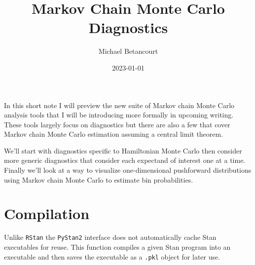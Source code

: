 \documentclass[
  letterpaper,
  DIV=11,
  numbers=noendperiod]{scrartcl}
\title{Markov Chain Monte Carlo Diagnostics}
\author{Michael Betancourt}
\date{2023-01-01}
\renewcommand*\contentsname{Table of contents}
\newcommand\contentsname{Table of contents}
\begin{document}
\maketitle

\renewcommand*\contentsname{Table of contents}
{
\hypersetup{linkcolor=}
\setcounter{tocdepth}{3}
\tableofcontents
}
In this short note I will preview the new suite of Markov chain Monte
Carlo analysis tools that I will be introducing more formally in
upcoming writing. These tools largely focus on diagnostics but there are
also a few that cover Markov chain Monte Carlo estimation assuming a
central limit theorem.

We'll start with diagnostics specific to Hamiltonian Monte Carlo then
consider more generic diagnostics that consider each expectand of
interest one at a time. Finally we'll look at a way to visualize
one-dimensional pushforward distributions using Markov chain Monte Carlo
to estimate bin probabilities.

\section{Compilation}\label{compilation}

Unlike \texttt{RStan} the \texttt{PyStan2} interface does not
automatically cache Stan executables for reuse. This function compiles a
given Stan program into an executable and then saves the executable as a
\texttt{.pkl} object for later use.
\end{document}
